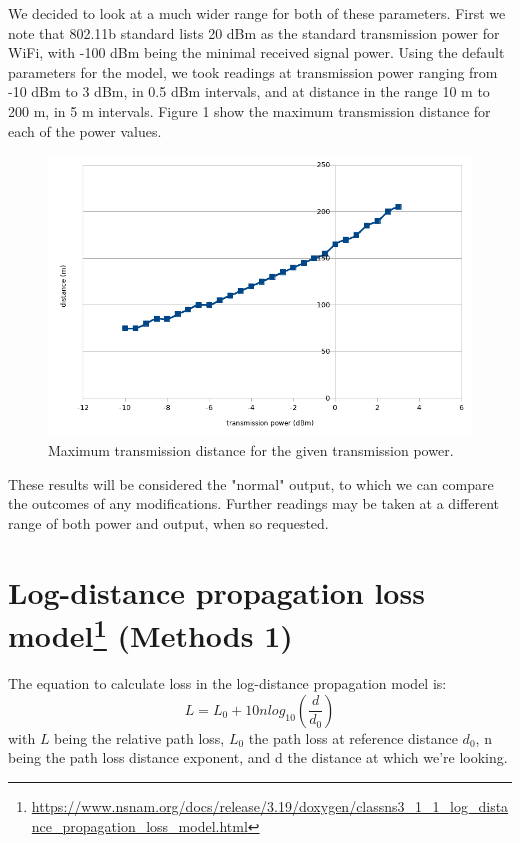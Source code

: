 \documentclass[11pt,journal]{article}
\begin{document}
	We decided to look at a much wider range for both of these parameters. First we note that 802.11b standard lists 20 dBm as the standard transmission power for WiFi, with -100 dBm being the minimal received signal power. Using the default parameters for the model, we took readings at transmission power ranging from -10 dBm to 3 dBm, in 0.5 dBm intervals, and at distance in the range 10 m to 200 m, in 5 m intervals. Figure 1 show the maximum transmission distance for each of the power values.
	
	\begin{figure}[h]
		\centering
		\includegraphics[scale=0.6]{graph_initial.png}
		\caption{Maximum transmission distance for the given transmission power.}
	\end{figure}

	These results will be considered the "normal" output, to which we can compare the outcomes of any modifications. Further readings may be taken at a different range of both power and output, when so requested.
	
	
	
	\section{Log-distance propagation loss model\footnote{\url{https://www.nsnam.org/docs/release/3.19/doxygen/classns3_1_1_log_distance_propagation_loss_model.html}} (Methods 1)}
	The equation to calculate loss in the log-distance propagation model is:
	\[L = L_0 + 10nlog_{10}(\dfrac{d}{d_0})\] 
	with $L$ being the relative path loss, $L_0$ the path loss at reference distance $d_0$, n being the path loss distance exponent, and d the distance at which we're looking.
	
\end{document}
